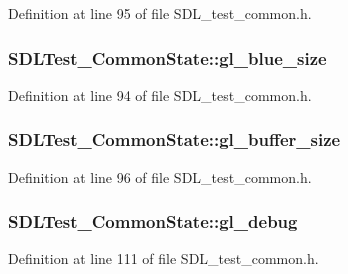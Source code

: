 Definition at line 95 of file S\-D\-L\-\_\-test\-\_\-common.\-h.

\hypertarget{struct_s_d_l_test___common_state_aff43a763af98b8eb651c41ec931e5d93}{
\subsubsection[{gl\-\_\-blue\-\_\-size}]{ S\-D\-L\-Test\-\_\-\-Common\-State\-::gl\-\_\-blue\-\_\-size}}\label{struct_s_d_l_test___common_state_aff43a763af98b8eb651c41ec931e5d93}


Definition at line 94 of file S\-D\-L\-\_\-test\-\_\-common.\-h.

\hypertarget{struct_s_d_l_test___common_state_a7e7ea32a3ba51db836b3aa7f31163921}{
\subsubsection[{gl\-\_\-buffer\-\_\-size}]{ S\-D\-L\-Test\-\_\-\-Common\-State\-::gl\-\_\-buffer\-\_\-size}}\label{struct_s_d_l_test___common_state_a7e7ea32a3ba51db836b3aa7f31163921}


Definition at line 96 of file S\-D\-L\-\_\-test\-\_\-common.\-h.

\hypertarget{struct_s_d_l_test___common_state_a2710657ef2a0c8aabebc5fceb01c71b5}{
\subsubsection[{gl\-\_\-debug}]{ S\-D\-L\-Test\-\_\-\-Common\-State\-::gl\-\_\-debug}}\label{struct_s_d_l_test___common_state_a2710657ef2a0c8aabebc5fceb01c71b5}


Definition at line 111 of file S\-D\-L\-\_\-test\-\_\-common.\-h.

